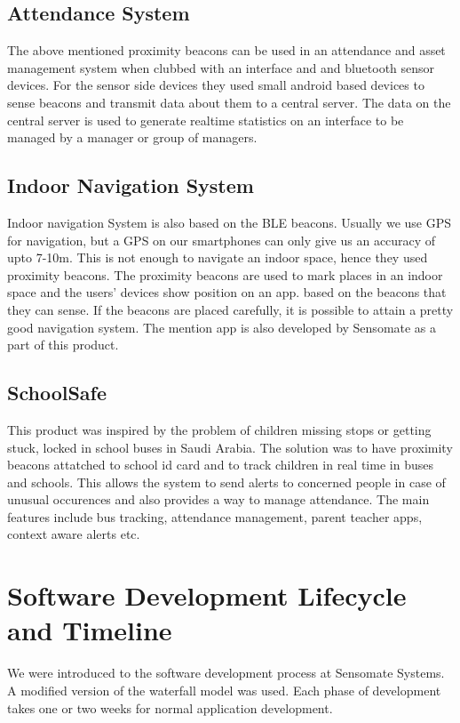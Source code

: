\documentclass[a4paper,12pt]{report}
\begin{document}
			\subsection{Attendance System}
			The above mentioned proximity beacons can be used in an attendance and asset management system when clubbed with an interface and and bluetooth sensor devices. For the sensor side devices they used small android based devices to sense beacons and transmit data about them to a central server. The data on the central server is used to generate realtime statistics on an interface to be managed by a manager or group of managers.
			\subsection{Indoor Navigation System}
			Indoor navigation System is also based on the BLE beacons. Usually we use GPS for navigation, but a GPS on our smartphones can only give us an accuracy of upto 7-10m. This is not enough to navigate an indoor space, hence they used proximity beacons. The proximity beacons are used to mark places in an indoor space and the users' devices show position on an app. based on the beacons that they can sense. If the beacons are placed carefully, it is possible to attain a pretty good navigation system. The mention app is also developed by Sensomate as a part of this product.
			\subsection{SchoolSafe}
			This product was inspired by the problem of children missing stops or getting stuck, locked in school buses in Saudi Arabia. The solution was to have proximity beacons attatched to school id card and to track children in real time in buses and schools. This allows the system to send alerts to concerned people in case of unusual occurences and also provides a way to manage attendance. The main features include bus tracking, attendance management, parent teacher apps, context aware alerts etc.   
		\section{Software Development Lifecycle and Timeline}
			We were introduced to the software development process at Sensomate Systems. A modified version of the waterfall model was used. Each phase of development takes one or two weeks for normal application development.
\end{document}
